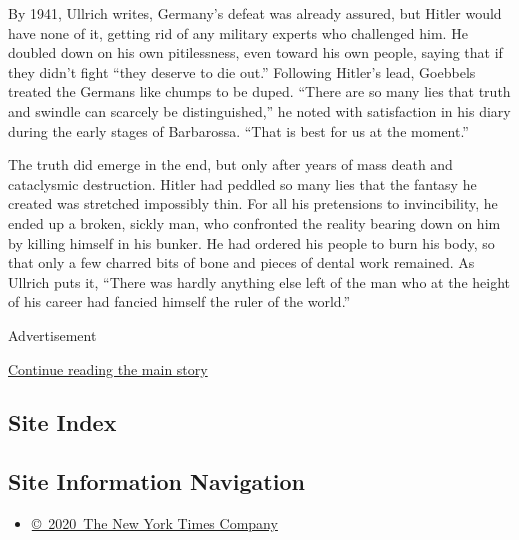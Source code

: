 By 1941, Ullrich writes, Germany's defeat was already assured, but
Hitler would have none of it, getting rid of any military experts who
challenged him. He doubled down on his own pitilessness, even toward his
own people, saying that if they didn't fight ``they deserve to die
out.'' Following Hitler's lead, Goebbels treated the Germans like chumps
to be duped. ``There are so many lies that truth and swindle can
scarcely be distinguished,'' he noted with satisfaction in his diary
during the early stages of Barbarossa. ``That is best for us at the
moment.''

The truth did emerge in the end, but only after years of mass death and
cataclysmic destruction. Hitler had peddled so many lies that the
fantasy he created was stretched impossibly thin. For all his
pretensions to invincibility, he ended up a broken, sickly man, who
confronted the reality bearing down on him by killing himself in his
bunker. He had ordered his people to burn his body, so that only a few
charred bits of bone and pieces of dental work remained. As Ullrich puts
it, ``There was hardly anything else left of the man who at the height
of his career had fancied himself the ruler of the world.''

Advertisement

\protect\hyperlink{after-bottom}{Continue reading the main story}

\hypertarget{site-index}{%
\subsection{Site Index}\label{site-index}}

\hypertarget{site-information-navigation}{%
\subsection{Site Information
Navigation}\label{site-information-navigation}}

\begin{itemize}
\tightlist
\item
  \href{https://help.nytimes3xbfgragh.onion/hc/en-us/articles/115014792127-Copyright-notice}{©~2020~The
  New York Times Company}
\end{itemize}

